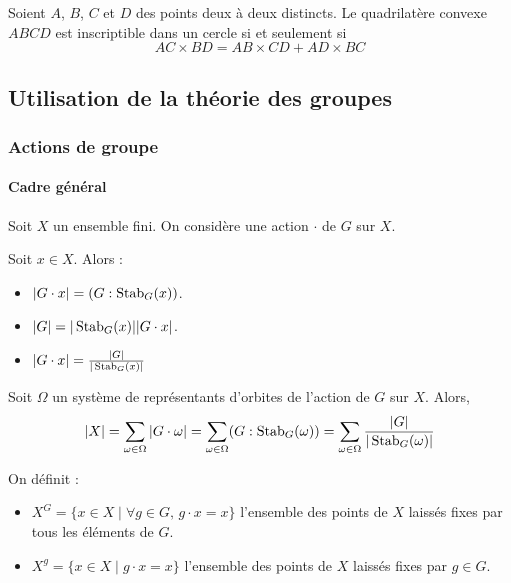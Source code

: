   \begin{corollary}
    Soient $A$, $B$, $C$ et $D$ des points deux à deux distincts. Le quadrilatère convexe $ABCD$ est inscriptible dans un cercle si et seulement si
    \[ AC \times BD = AB \times CD + AD \times BC \]
  \end{corollary}

  \subsection{Utilisation de la théorie des groupes}

  \subsubsection{Actions de groupe}

  \paragraph{Cadre général}


  Soit $X$ un ensemble fini. On considère une action $\cdot$ de $G$ sur $X$.

  \begin{proposition}
    Soit $x \in X$. Alors :
    \begin{itemize}
      \item $|G \cdot x| = (G : \operatorname{Stab}_G(x))$.
      \item $|G| = |\operatorname{Stab}_G(x)| |G \cdot x|$.
      \item $|G \cdot x| = \frac{|G|}{|\operatorname{Stab}_G(x)|}$
    \end{itemize}
  \end{proposition}

  \begin{theorem}
    Soit $\Omega$ un système de représentants d'orbites de l'action de $G$ sur $X$. Alors,
    \[ |X| = \sum_{\omega \in \Omega} |G \cdot \omega| = \sum_{\omega \in \Omega} (G : \operatorname{Stab}_G(\omega)) = \sum_{\omega \in \Omega} \frac{|G|}{|\operatorname{Stab}_G(\omega)|} \]
  \end{theorem}

  \begin{definition}
    On définit :
    \begin{itemize}
      \item $X^G = \{ x \in X \mid \forall g \in G, \, g \cdot x = x \}$ l'ensemble des points de $X$ laissés fixes par tous les éléments de $G$.
      \item $X^g = \{ x \in X \mid g \cdot x = x \}$ l'ensemble des points de $X$ laissés fixes par $g \in G$.
    \end{itemize}
  \end{definition}

